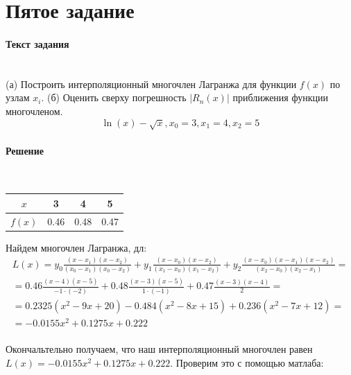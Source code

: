 \section{Пятое задание}

\paragraph{Текст задания} ~\\
(а) Построить интерполяционный многочлен Лагранжа для функции $f(x)$ по узлам $x_{i}$. (б) Оценить сверху погрешность $|R_{n}(x)|$ приближения функции многочленом.\\[2mm]
\[
  \ln(x) - \sqrt{x}, x_{0} = 3, x_{1} = 4, x_{2} = 5
\]

\paragraph{Решение} ~\\

\begin{tabular}{|c | c | c | c|}
  \hline
  $x$ & 3 & 4 & 5 \\
  \hline
  $f(x)$ & 0.46 & 0.48 & 0.47 \\
  \hline
\end{tabular}

Найдем многочлен Лагранжа, дл:
\begin{multline*}
  L(x) = y_{0} \frac{(x - x_{1})(x - x_{2})}{(x_{0} - x_{1})(x_{0} - x_{2})} + y_{1} \frac{(x - x_{0})(x - x_{2})}{(x_{1} - x_{0})(x_{1} - x_{2})} + y_{2} \frac{(x - x_{0})(x - x_{1})(x - x_{2})}{(x_{2} - x_{0})(x_{2} - x_{1})} = \\[3mm]
  = 0.46 \frac{(x - 4)(x - 5)}{-1 \cdot (-2)} + 0.48 \frac{(x - 3)(x-5)}{1 \cdot (-1)} + 0.47 \frac{(x - 3)(x-4)}{2} = \\[3mm]
  = 0.2325(x^{2}-9x+20) - 0.484(x^{2}-8x+15) + 0.236(x^{2}-7x+12) = \\[3mm]
  = -0.0155x^{2} + 0.1275x + 0.222
\end{multline*}\\[2mm]
Окончальтельно получаем, что наш интерполяционный многочлен равен $L(x) = -0.0155x^{2} + 0.1275x + 0.222$. Проверим это с помощью матлаба:

